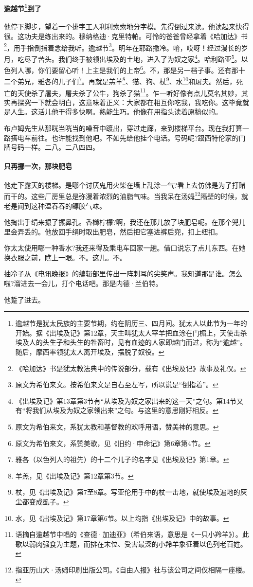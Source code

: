 \paragraph*{逾越节\footnote{逾越节是犹太民族的主要节期，约在阴历三、四月间。犹太人以此节为一年的开始。据《出埃及记》第12章，天主叫犹太人宰羊把血涂在门楣上，天使击杀埃及人的头生子和头生的牲畜时，见有血迹的人家即越门而过，称为“逾越”。随后，摩西率领犹太人离开埃及，摆脱了奴役。}到了}
\par 他停下脚步，望着一个排字工人利利索索地分字模。先得倒过来读。他读起来快得很。这功夫是练出来的。穆纳格迪·克里特帕。可怜的爸爸曾经拿着《哈加达》书\footnote{《哈加达》书是犹太教法典中的传说部分，载有《出埃及记》故事及礼仪。}，用手指倒指着念给我听。逾越节\footnote{原文为希伯来文。按希伯来文是自右至左写，所以说是“倒指着”。}。明年在耶路撒冷。唷，哎呀！经过漫长的岁月，吃尽了苦头。我们终于被领出埃及的土地，进入了为奴之家\footnote{《出埃及记》第13章第3节有“从埃及为奴之家出来的这一天”之句。第14节又有“将我们从埃及为奴之家领出来”之句。与这里的意思刚好相反。}。哈利路亚\footnote{原文为希伯来文，系犹太教和基督教的欢呼用语，赞美神的意思。}。以色列人哪，你们要留心听！上主是我们的上帝\footnote{原文为希伯来文，系赞美歌，见《旧约·申命记》第6章第4节。}。不，那是另一档子事。还有那十二个弟兄，雅各的儿子们\footnote{雅各（以色列人的祖先）的十二个儿子的名字见《出埃及记》第1章。}。再就是羔羊\footnote{羊羔，见《出埃及记》第12章第3节。}、猫、狗、杖\footnote{杖，见《出埃及记》第7至8章。写亚伦用手中的杖一击地，就使埃及遍地的灰尘都变成虱子。}、水\footnote{水，见《出埃及记》第17章第6节。以上均指《出埃及记》中的故事。}和屠夫。然后，死亡的天使杀了屠夫，屠夫杀了公牛，狗杀了猫\footnote{语摘自逾越节中唱的《查德·加迪亚》（希伯来语，意思是《一只小羚羊》）。此歌以弱肉强食为主题，而排在末位、受害最深的小羚羊象征着以色列老百姓。}。乍一听好像有点儿莫名其妙，其实再探究一下就会明白，这意味着正义：大家都在相互你吃我，我吃你。这毕竟就是人生。这活儿他干得多快啊。熟能生巧。他像在用指头读着原稿似的。
\par 布卢姆先生从那咣当咣当的噪音中踱出，穿过走廊，来到楼梯平台。现在我打算一路搭电车前往。也许能找到他吧。不如先给他挂个电话。号码呢?跟西特伦家的门牌号码一样。二八。二八四四。
\paragraph*{只再挪一次，那块肥皂}
\par 他走下露天的楼梯。是哪个讨厌鬼用火柴在墙上乱涂一气?看上去仿佛是为了打赌而干的。这些厂房里总是弥漫着浓烈的油脂气味。当我呆在汤姆\footnote{指亚历山大·汤姆印刷出版公司。《自由人报》社与该公司之间仅相隔一座楼。}隔壁的时候，就老是闻到这种温吞吞的鳔胶气味。
\par 他掏出手绢来搌了搌鼻孔。香橼柠檬?啊，我还在那儿放了块肥皂呢。在那个兜儿里会弄丢的。他放回手绢时取出肥皂，然后把它塞进裤后兜，扣上纽扣。
\par 你太太使用哪一种香水?我还来得及乘电车回家一趟。借口说忘了点儿东西。在她换衣服之前，瞧上一眼。不。这儿。不。
\par 抽冷子从《电讯晚报》的编辑部里传出一阵刺耳的尖笑声。我知道那是谁。怎么啦?溜进去一会儿，打个电话吧。那是内德·兰伯特。
\par 他踅了进去。
